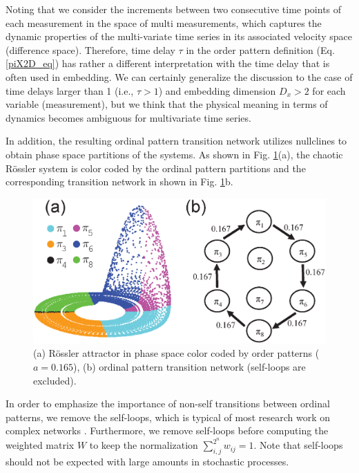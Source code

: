 		Noting that we consider the increments between two consecutive time points of each measurement in the space of multi measurements, which captures the dynamic properties of the multi-variate time series in its associated velocity space (difference space). Therefore, time delay $\tau$ in the order pattern definition (Eq. \eqref{piX2D_eq}) has rather a different interpretation with the time delay that is often used in embedding. We can certainly generalize the discussion to the case of time delays larger than 1 (i.e., $\tau > 1$) and embedding dimension $D_x  > 2$ for each variable (measurement), but we think that the physical meaning in terms of dynamics becomes ambiguous for multivariate time series.  

		In addition, the resulting ordinal pattern transition network utilizes nullclines to obtain phase space partitions of the systems. As shown in Fig. \ref{fig:rosslerTwoA}(a), the chaotic R\"ossler system is color coded by the ordinal pattern partitions and the corresponding transition network in shown in Fig. \ref{fig:rosslerTwoA}b. 
\begin{figure}[ht]
	\centering
	\includegraphics[width=0.7\columnwidth]{Chapter05_TransitionNt/rossler_0165N.eps}

\caption{(a) R\"ossler attractor in phase space color coded by order patterns ($a = 0.165$), (b) ordinal pattern transition network (self-loops are excluded). \label{fig:rosslerTwoA}}
\end{figure}

		In order to emphasize the importance of non-self transitions between ordinal patterns, we remove the self-loops, which is typical of most research work on complex networks \cite{Costa2007}. Furthermore, we remove self-loops before computing the weighted matrix $W$ to keep the normalization $\sum_{i,j}^{2^n} w_{ij} = 1$. Note that self-loops should not be expected with large amounts in stochastic processes. 
		
